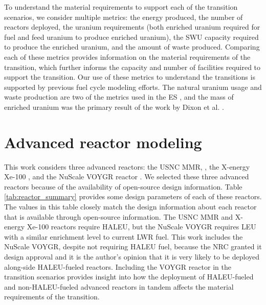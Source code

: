 To understand the material requirements to support each of the 
transition scenarios, we consider multiple metrics: 
the energy produced, the number of reactors deployed, the 
uranium requirements (both enriched uranium required for fuel and feed uranium 
to produce enriched uranium), 
the \gls{SWU} capacity required to produce the enriched uranium, and the 
amount of waste produced. Comparing each of these metrics provides 
information on the material requirements of the transition, which further 
informs the capacity and number of facilities required to support 
the transition. Our use of these metrics to understand the transitions 
is supported by previous fuel cycle modeling efforts. The natural 
uranium usage and waste production are two of the metrics used in the 
\acrfull{ES} 
\cite{wigeland_nuclear_2014}, and the mass of enriched uranium was the 
primary result of the work by Dixon et al. \cite{dixon_estimated_2022}. 

\section{Advanced reactor modeling} \label{sec:reactor_methods}
This work considers three advanced reactors: the \gls{USNC} \gls{MMR}, 
\cite{mitchell_usnc_2020,noauthor_usnc_2021}, the X-energy Xe-100 
\cite{mulder_overview_2021}, and the NuScale VOYGR reactor
\cite{nuscale_chapter_2020-1,reyes_nuscale_2021,reyes_correction_2022}. 
We selected these three advanced reactors because of the 
availability of open-source design information. 
Table \ref{tab:reactor_summary} provides some design parameters 
of each of these reactors. The values in this table closely match the 
design information about each reactor that is available through open-source 
information. The 
\gls{USNC} \gls{MMR} and X-energy Xe-100 reactors require \gls{HALEU}, 
but the NuScale VOYGR requires \gls{LEU} with a similar enrichment level 
to current \gls{LWR} fuel. This work 
includes the NuScale VOYGR, despite not requiring \gls{HALEU} fuel, 
because the \gls{NRC} granted it design approval \cite{world_nuclear_news_nuscale_2021} 
and it is the author's opinion that it is very likely to be deployed 
along-side \gls{HALEU}-fueled 
reactors. Including the VOYGR reactor in the transition scenarios provides 
insight into how the deployment of \gls{HALEU}-fueled and non-\gls{HALEU}-fueled 
advanced reactors in tandem affects the material requirements of the transition. 

